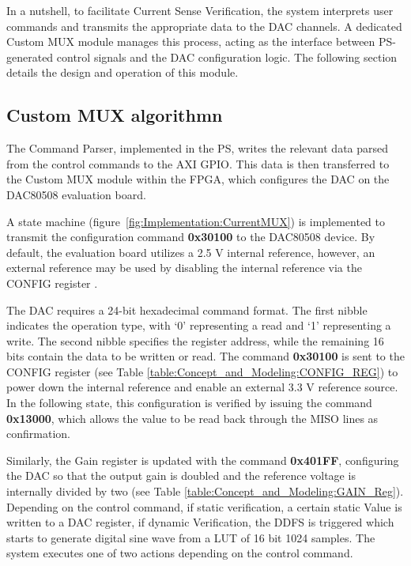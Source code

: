 In a nutshell, to facilitate Current Sense Verification, the system interprets user commands and transmits the appropriate data to the \acs{DAC} channels. A dedicated Custom MUX module manages this process, acting as the interface between \acs{PS}-generated control signals and the \acs{DAC} configuration logic. The following section details the design and operation of this module.

\subsection{Custom MUX algorithmn}
\label{sec:Implementation:Custom_MUX_algorithmn}

The Command Parser, implemented in the \acs{PS}, writes the relevant data parsed from the control commands to the \acs{AXI} \acs{GPIO}. This data is then transferred to the Custom MUX module within the \acs{FPGA}, which configures the \acs{DAC} on the DAC80508 evaluation board. 

A state machine (figure~\ref{fig:Implementation:CurrentMUX}) is implemented to transmit the configuration command \textbf{0x30100} to the DAC80508 device. By default, the evaluation board utilizes a 2.5 V internal reference, however, an external reference may be used by disabling the internal reference via the CONFIG register \cite{TI_DAC80508}.

The \acs{DAC} requires a 24-bit hexadecimal command format. The first nibble indicates the operation type, with ‘0’ representing a read and ‘1’ representing a write. The second nibble specifies the register address, while the remaining 16 bits contain the data to be written or read. The command \textbf{0x30100} is sent to the CONFIG register (see Table \ref{table:Concept_and_Modeling:CONFIG_REG}) to power down the internal reference and enable an external 3.3 V reference source. In the following state, this configuration is verified by issuing the command \textbf{0x13000}, which allows the value to be read back through the MISO lines as confirmation.


Similarly, the Gain register is updated with the command \textbf{0x401FF}, configuring the \acs{DAC} so that the output gain is doubled and the reference voltage is internally divided by two (see Table \ref{table:Concept_and_Modeling:GAIN_Reg}). Depending on the control command, if static verification, a certain static Value is written to a \acs{DAC} register, if dynamic Verification, the \acs{DDFS} is triggered which starts to generate digital sine wave from a \acs{LUT} of 16 bit 1024 samples. The system executes one of two actions depending on the control command.


